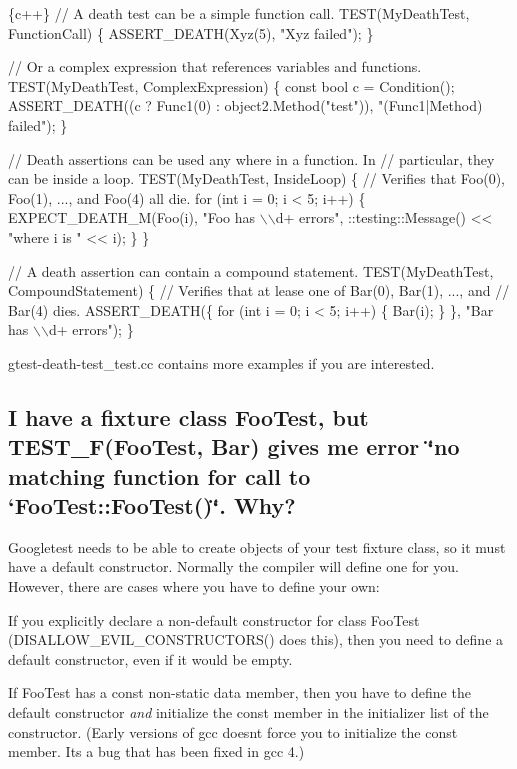 \begin{DoxyCode}
\{c++\}
// A death test can be a simple function call.
TEST(MyDeathTest, FunctionCall) \{
  ASSERT\_DEATH(Xyz(5), "Xyz failed");
\}

// Or a complex expression that references variables and functions.
TEST(MyDeathTest, ComplexExpression) \{
  const bool c = Condition();
  ASSERT\_DEATH((c ? Func1(0) : object2.Method("test")),
               "(Func1|Method) failed");
\}

// Death assertions can be used any where in a function.  In
// particular, they can be inside a loop.
TEST(MyDeathTest, InsideLoop) \{
  // Verifies that Foo(0), Foo(1), ..., and Foo(4) all die.
  for (int i = 0; i < 5; i++) \{
    EXPECT\_DEATH\_M(Foo(i), "Foo has \(\backslash\)\(\backslash\)d+ errors",
                   ::testing::Message() << "where i is " << i);
  \}
\}

// A death assertion can contain a compound statement.
TEST(MyDeathTest, CompoundStatement) \{
  // Verifies that at lease one of Bar(0), Bar(1), ..., and
  // Bar(4) dies.
  ASSERT\_DEATH(\{
    for (int i = 0; i < 5; i++) \{
      Bar(i);
    \}
  \},
  "Bar has \(\backslash\)\(\backslash\)d+ errors");
\}
\end{DoxyCode}


gtest-\/death-\/test\+\_\+test.\+cc contains more examples if you are interested.

\subsection*{I have a fixture class {\ttfamily Foo\+Test}, but {\ttfamily T\+E\+S\+T\+\_\+\+F(\+Foo\+Test, Bar)} gives me error {\ttfamily \char`\"{}no matching function for call to `\+Foo\+Test\+::\+Foo\+Test()\textquotesingle{}\char`\"{}}. Why?}

Googletest needs to be able to create objects of your test fixture class, so it must have a default constructor. Normally the compiler will define one for you. However, there are cases where you have to define your own\+:


\begin{DoxyItemize}
\item If you explicitly declare a non-\/default constructor for class {\ttfamily Foo\+Test} ({\ttfamily D\+I\+S\+A\+L\+L\+O\+W\+\_\+\+E\+V\+I\+L\+\_\+\+C\+O\+N\+S\+T\+R\+U\+C\+T\+O\+R\+S()} does this), then you need to define a default constructor, even if it would be empty.
\item If {\ttfamily Foo\+Test} has a const non-\/static data member, then you have to define the default constructor {\itshape and} initialize the const member in the initializer list of the constructor. (Early versions of {\ttfamily gcc} doesn\textquotesingle{}t force you to initialize the const member. It\textquotesingle{}s a bug that has been fixed in {\ttfamily gcc 4}.)
\end{DoxyItemize}

